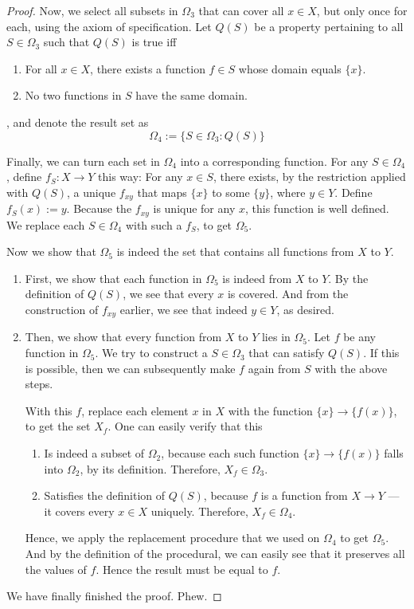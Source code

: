 \begin{proof}
	Now, we select all subsets in $\Omega_3$ that can cover all $x \in X$, but only once for each, using the axiom of specification. Let $Q(S)$ be a property pertaining to all $S \in \Omega_3$ such that $Q(S)$ is true iff
	\begin{enumerate}
		\item For all $x \in X$, there exists a function $f \in S$ whose domain equals $\{x\}$.
		\item No two functions in $S$ have the same domain.
	\end{enumerate}
	, and denote the result set as
	\[
		\Omega_4 := \{S \in \Omega_3 : Q(S)\}
	\]
	
	Finally, we can turn each set in $\Omega_4$ into a corresponding function. For any $S \in \Omega_4$, define $f_S: X \to Y$ this way: For any $x \in S$, there exists, by the restriction applied with $Q(S)$, a unique $f_{xy}$ that maps $\{x\}$ to some $\{y\}$, where $y \in Y$. Define $f_S(x) := y$. Because the $f_{xy}$ is unique for any $x$, this function is well defined. We replace each $S \in \Omega_4$ with such a $f_S$, to get $\Omega_5$.
	
	Now we show that $\Omega_5$ is indeed the set that contains all functions from $X$ to $Y$.
	\begin{enumerate}
		\item First, we show that each function in $\Omega_5$ is indeed from $X$ to $Y$. By the definition of $Q(S)$, we see that every $x$ is covered. And from the construction of $f_{xy}$ earlier, we see that indeed $y \in Y$, as desired.
		
		\item Then, we show that every function from $X$ to $Y$ lies in $\Omega_5$. Let $f$ be any function in $\Omega_5$. We try to construct a $S \in \Omega_3$ that can satisfy $Q(S)$. If this is possible, then we can subsequently make $f$ again from $S$ with the above steps.
		
		With this $f$, replace each element $x$ in $X$ with the function $\{x\} \to \{f(x)\}$, to get the set $X_f$. One can easily verify that this
		\begin{enumerate}
			\item Is indeed a subset of $\Omega_2$, because each such function $\{x\} \to \{f(x)\}$ falls into $\Omega_2$, by its definition. Therefore, $X_f \in \Omega_3$.
			
			\item Satisfies the definition of $Q(S)$, because $f$ is a function from $X \to Y$ --- it covers every $x \in X$ uniquely. Therefore, $X_f \in \Omega_4$.
		\end{enumerate}
	
		Hence, we apply the replacement procedure that we used on $\Omega_4$ to get $\Omega_5$. And by the definition of the procedural, we can easily see that it preserves all the values of $f$. Hence the result must be equal to $f$.
	\end{enumerate}
	
	We have finally finished the proof. Phew.
\end{proof}

